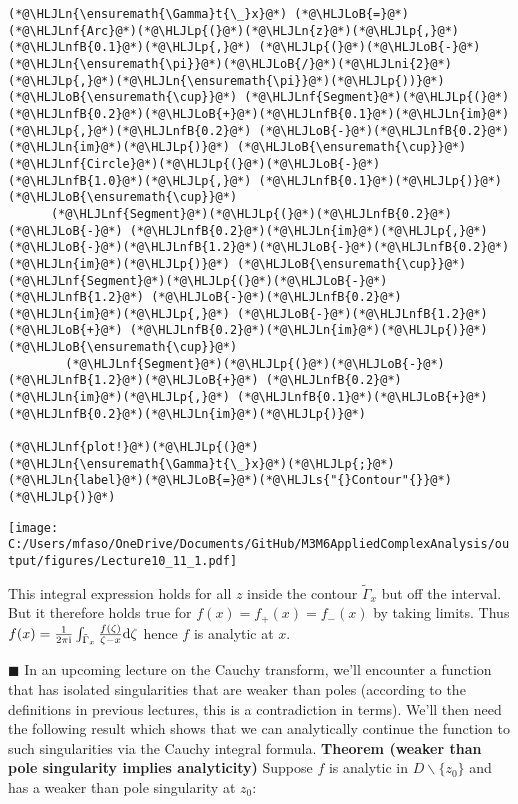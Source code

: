 \documentclass[12pt,a4paper]{article}
\newcommand{\HLJLn}[1]{#1}
\newcommand{\HLJLnf}[1]{\textcolor[RGB]{66,102,213}{#1}}
\newcommand{\HLJLs}[1]{\textcolor[RGB]{201,61,57}{#1}}
\newcommand{\HLJLnfB}[1]{\textcolor[RGB]{59,151,46}{#1}}
\newcommand{\HLJLni}[1]{\textcolor[RGB]{59,151,46}{#1}}
\newcommand{\HLJLoB}[1]{\textcolor[RGB]{102,102,102}{\textbf{#1}}}
\newcommand{\HLJLp}[1]{#1}
\def\D{ {\rm d} }
\def\I{ {\rm i} }
\def\mdblksquare{\blacksquare}
\begin{document}
\begin{lstlisting}
(*@\HLJLn{\ensuremath{\Gamma}t{\_}x}@*) (*@\HLJLoB{=}@*)  (*@\HLJLnf{Arc}@*)(*@\HLJLp{(}@*)(*@\HLJLn{z}@*)(*@\HLJLp{,}@*) (*@\HLJLnfB{0.1}@*)(*@\HLJLp{,}@*) (*@\HLJLp{(}@*)(*@\HLJLoB{-}@*)(*@\HLJLn{\ensuremath{\pi}}@*)(*@\HLJLoB{/}@*)(*@\HLJLni{2}@*)(*@\HLJLp{,}@*)(*@\HLJLn{\ensuremath{\pi}}@*)(*@\HLJLp{))}@*) (*@\HLJLoB{\ensuremath{\cup}}@*) (*@\HLJLnf{Segment}@*)(*@\HLJLp{(}@*)(*@\HLJLnfB{0.2}@*)(*@\HLJLoB{+}@*)(*@\HLJLnfB{0.1}@*)(*@\HLJLn{im}@*)(*@\HLJLp{,}@*)(*@\HLJLnfB{0.2}@*) (*@\HLJLoB{-}@*)(*@\HLJLnfB{0.2}@*)(*@\HLJLn{im}@*)(*@\HLJLp{)}@*) (*@\HLJLoB{\ensuremath{\cup}}@*)    (*@\HLJLnf{Circle}@*)(*@\HLJLp{(}@*)(*@\HLJLoB{-}@*)(*@\HLJLnfB{1.0}@*)(*@\HLJLp{,}@*) (*@\HLJLnfB{0.1}@*)(*@\HLJLp{)}@*) (*@\HLJLoB{\ensuremath{\cup}}@*)
      (*@\HLJLnf{Segment}@*)(*@\HLJLp{(}@*)(*@\HLJLnfB{0.2}@*) (*@\HLJLoB{-}@*) (*@\HLJLnfB{0.2}@*)(*@\HLJLn{im}@*)(*@\HLJLp{,}@*) (*@\HLJLoB{-}@*)(*@\HLJLnfB{1.2}@*)(*@\HLJLoB{-}@*)(*@\HLJLnfB{0.2}@*)(*@\HLJLn{im}@*)(*@\HLJLp{)}@*) (*@\HLJLoB{\ensuremath{\cup}}@*) (*@\HLJLnf{Segment}@*)(*@\HLJLp{(}@*)(*@\HLJLoB{-}@*)(*@\HLJLnfB{1.2}@*) (*@\HLJLoB{-}@*)(*@\HLJLnfB{0.2}@*)(*@\HLJLn{im}@*)(*@\HLJLp{,}@*) (*@\HLJLoB{-}@*)(*@\HLJLnfB{1.2}@*)(*@\HLJLoB{+}@*) (*@\HLJLnfB{0.2}@*)(*@\HLJLn{im}@*)(*@\HLJLp{)}@*) (*@\HLJLoB{\ensuremath{\cup}}@*)
        (*@\HLJLnf{Segment}@*)(*@\HLJLp{(}@*)(*@\HLJLoB{-}@*)(*@\HLJLnfB{1.2}@*)(*@\HLJLoB{+}@*) (*@\HLJLnfB{0.2}@*)(*@\HLJLn{im}@*)(*@\HLJLp{,}@*) (*@\HLJLnfB{0.1}@*)(*@\HLJLoB{+}@*)(*@\HLJLnfB{0.2}@*)(*@\HLJLn{im}@*)(*@\HLJLp{)}@*)

(*@\HLJLnf{plot!}@*)(*@\HLJLp{(}@*)(*@\HLJLn{\ensuremath{\Gamma}t{\_}x}@*)(*@\HLJLp{;}@*) (*@\HLJLn{label}@*)(*@\HLJLoB{=}@*)(*@\HLJLs{"{}Contour"{}}@*)(*@\HLJLp{)}@*)
\end{lstlisting}

\texttt{[image: C:/Users/mfaso/OneDrive/Documents/GitHub/M3M6AppliedComplexAnalysis/output/figures/Lecture10\_11\_1.pdf]}

This integral expression holds for all $z$ inside the contour $\tilde \Gamma_x$ but off the interval. But it therefore holds true for $f(x) = f_+(x) = f_-(x)$ by taking limits.  Thus $f(x) = {1 \over 2 \pi \I} \int_{{\tilde \Gamma}_x} {f(\zeta) \over \zeta -x} \D\zeta$ hence $f$ is analytic at $x$.

\ensuremath{\mdblksquare} In an upcoming lecture on the Cauchy transform, we'll encounter a function that has isolated singularities that are weaker than poles (according to the definitions in previous lectures, this is a contradiction in terms). We'll then need the following result which shows that we can analytically continue the function to such singularities via the Cauchy integral formula. \textbf{Theorem (weaker than pole singularity implies analyticity)} Suppose $f$ is analytic in $D \backslash \{ z_0 \}$ and has a weaker than pole singularity at $z_0$:
\end{document}
